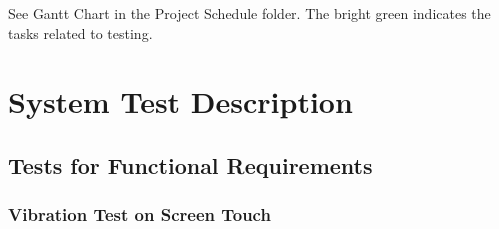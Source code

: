See Gantt Chart in the Project Schedule folder. The bright green indicates the tasks related to testing.

\section{System Test Description}
	
\subsection{Tests for Functional Requirements}

\subsubsection{Vibration Test on Screen Touch}
		

